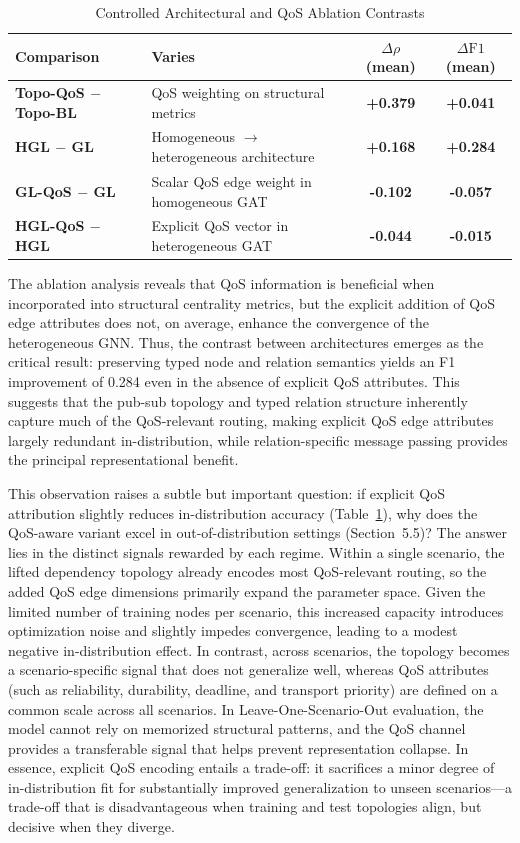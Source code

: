 \documentclass[sigconf,9pt,anonymous]{acmart}
\begin{document}
\begin{table}[t]
\centering
\caption{Controlled Architectural and QoS Ablation Contrasts}
\label{tab:factorial_contrasts}
\begin{tabular}{l l c c}
\toprule
\textbf{Comparison} & \textbf{Varies} & \textbf{$\Delta\rho$ (mean)} & \textbf{$\Delta\text{F1}$ (mean)} \\
\midrule
\textbf{Topo-QoS $-$ Topo-BL} & QoS weighting on structural metrics & \textbf{+0.379} & \textbf{+0.041} \\
\textbf{HGL $-$ GL} & Homogeneous $\to$ heterogeneous architecture & \textbf{+0.168} & \textbf{+0.284} \\
\textbf{GL-QoS $-$ GL} & Scalar QoS edge weight in homogeneous GAT & \textbf{-0.102} & \textbf{-0.057} \\
\textbf{HGL-QoS $-$ HGL} & Explicit QoS vector in heterogeneous GAT & \textbf{-0.044} & \textbf{-0.015} \\
\bottomrule
\end{tabular}
\end{table}

The ablation analysis reveals that QoS information is beneficial when incorporated into structural centrality metrics, but the explicit addition of QoS edge attributes does not, on average, enhance the convergence of the heterogeneous GNN. Thus, the contrast between architectures emerges as the critical result: preserving typed node and relation semantics yields an F1 improvement of 0.284 even in the absence of explicit QoS attributes. This suggests that the pub-sub topology and typed relation structure inherently capture much of the QoS-relevant routing, making explicit QoS edge attributes largely redundant in-distribution, while relation-specific message passing provides the principal representational benefit.

This observation raises a subtle but important question: if explicit QoS attribution slightly reduces in-distribution accuracy (Table~\ref{tab:factorial_contrasts}), why does the QoS-aware variant excel in out-of-distribution settings (Section~5.5)? The answer lies in the distinct signals rewarded by each regime. Within a single scenario, the lifted dependency topology already encodes most QoS-relevant routing, so the added QoS edge dimensions primarily expand the parameter space. Given the limited number of training nodes per scenario, this increased capacity introduces optimization noise and slightly impedes convergence, leading to a modest negative in-distribution effect. In contrast, across scenarios, the topology becomes a scenario-specific signal that does not generalize well, whereas QoS attributes (such as reliability, durability, deadline, and transport priority) are defined on a common scale across all scenarios. In Leave-One-Scenario-Out evaluation, the model cannot rely on memorized structural patterns, and the QoS channel provides a transferable signal that helps prevent representation collapse. In essence, explicit QoS encoding entails a trade-off: it sacrifices a minor degree of in-distribution fit for substantially improved generalization to unseen scenarios—a trade-off that is disadvantageous when training and test topologies align, but decisive when they diverge.
\end{document}
